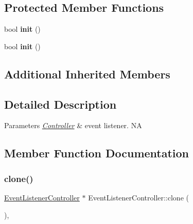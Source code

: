\subsection*{Protected Member Functions}
\begin{DoxyCompactItemize}
\item 
\mbox{\label{classEventListenerController_a00b5a84f33ede1023a5523af66a94493}} 
bool {\bfseries init} ()
\item 
\mbox{\label{classEventListenerController_a00b5a84f33ede1023a5523af66a94493}} 
bool {\bfseries init} ()
\end{DoxyCompactItemize}
\subsection*{Additional Inherited Members}


\subsection{Detailed Description}

\begin{DoxyParams}{Parameters}
{\em \hyperlink{classController}{Controller}} & event listener.  NA \\
\hline
\end{DoxyParams}


\subsection{Member Function Documentation}
\mbox{\label{classEventListenerController_ae4960229437589034e72b5c3dbb4a5c7}} 
\subsubsection{\texorpdfstring{clone()}{clone()}\hspace{0.1cm}{\footnotesize\ttfamily [1/2]}}
{\footnotesize\ttfamily \hyperlink{classEventListenerController}{Event\+Listener\+Controller} $\ast$ Event\+Listener\+Controller\+::clone (\begin{DoxyParamCaption}{ }\end{DoxyParamCaption})\hspace{0.3cm}{\ttfamily [override]}, {\ttfamily [virtual]}}

